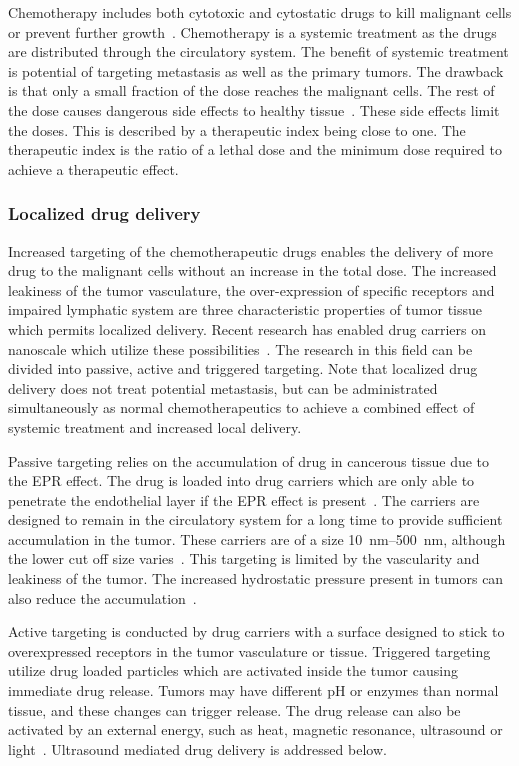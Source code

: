 Chemotherapy includes both cytotoxic and cytostatic drugs to kill malignant cells or prevent further growth~\cite{Skeel2011}. Chemotherapy is a systemic treatment as the drugs are distributed through the circulatory system. The benefit of systemic treatment is potential of targeting metastasis as well as the primary tumors. The drawback is that only a small fraction of the dose reaches the malignant cells. The rest of the dose causes dangerous side effects to healthy tissue~\cite{doi:10.1056/NEJM200106283442607}. These side effects limit the doses. This is described by a therapeutic index being close to one. The therapeutic index is the ratio of a lethal dose and the minimum dose required to achieve a therapeutic effect.
 
\subsubsection{Localized drug delivery}
Increased targeting of the chemotherapeutic drugs enables the delivery of more drug to the malignant cells without an increase in the total dose. The increased leakiness of the tumor vasculature, the over-expression of specific receptors and impaired lymphatic system are three characteristic properties of tumor tissue which permits localized delivery. Recent research has enabled drug carriers on nanoscale which utilize these possibilities~\cite{Jafari}. The research in this field can be divided into passive, active and triggered targeting. Note that localized drug delivery does not treat potential metastasis, but can be administrated simultaneously as normal chemotherapeutics to achieve a combined effect of systemic treatment and increased local delivery.

Passive targeting relies on the accumulation of drug in cancerous tissue due to the EPR effect. The drug is loaded into drug carriers which are only able to penetrate the endothelial layer if the EPR effect is present~\cite{Andresen2010}. The carriers are designed to remain in the circulatory system for a long time to provide sufficient accumulation in the tumor. These carriers are of a size \SIrange{10}{500}{\nano\meter}, although the lower cut off size varies~\cite{Hofmann}. This targeting is limited by the vascularity and leakiness of the tumor. The increased hydrostatic pressure present in tumors can also reduce the accumulation~\cite{Bae2009}.  

Active targeting is conducted by drug carriers with a surface designed to stick to overexpressed receptors in the tumor vasculature or tissue. Triggered targeting utilize drug loaded particles which are activated inside the tumor causing immediate drug release. Tumors may have different pH or enzymes than normal tissue,  and these changes can trigger release. The drug release can also be activated by an external energy, such as heat, magnetic resonance, ultrasound or light~\cite{Jafari}. Ultrasound mediated drug delivery is addressed below. 
	
